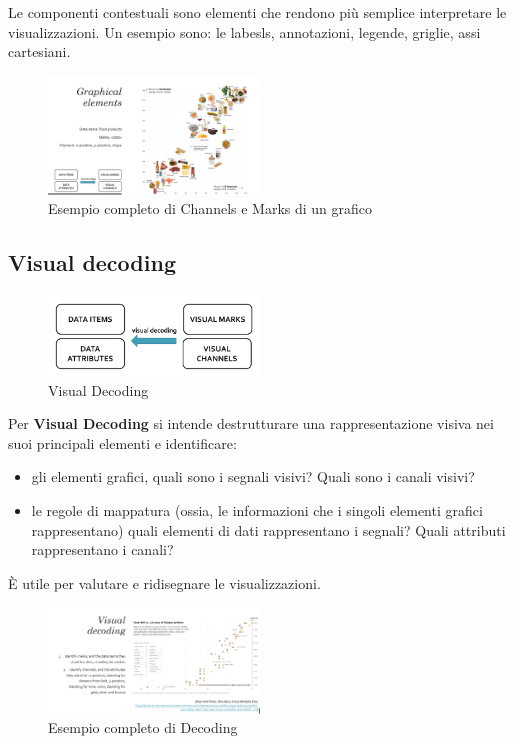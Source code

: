 Le componenti contestuali sono elementi che rendono più semplice interpretare le visualizzazioni.
Un esempio sono: le labesls, annotazioni, legende, griglie, assi cartesiani.
\begin{figure}[H]
    \centering
    \includegraphics[width=0.5\textwidth]{images/CompleteExMC.png} %
    \caption{Esempio completo di Channels e Marks di un grafico}
    \label{fig:immagine}
\end{figure}
\subsection{Visual decoding}
\begin{figure}[H]
    \centering
    \includegraphics[width=0.5\textwidth]{images/VisDec.png} %
    \caption{Visual Decoding}
    \label{fig:immagine}
\end{figure}
Per \textbf{Visual Decoding} si intende destrutturare una rappresentazione visiva nei suoi principali elementi e identificare:
\begin{itemize}
    \item gli elementi grafici, quali sono i segnali visivi? Quali sono i canali visivi?
    \item le regole di mappatura (ossia, le informazioni che i singoli elementi grafici rappresentano)
        quali elementi di dati rappresentano i segnali? Quali attributi rappresentano i canali?
\end{itemize}
È utile per valutare e ridisegnare le visualizzazioni.

\begin{figure}[H]
    \centering
    \includegraphics[width=0.5\textwidth]{images/ExComplDec.png} %
    \caption{Esempio completo di Decoding}
    \label{fig:immagine}
\end{figure}

